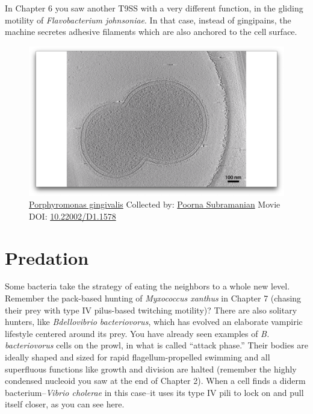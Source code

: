\documentclass[]{tufte-book}
\begin{document}
In Chapter 6 you saw another T9SS with a very different function, in the
gliding motility of \emph{Flavobacterium johnsoniae}. In that case,
instead of gingipains, the machine secretes adhesive filaments which are
also anchored to the cell surface.





\begin{figure}
\includegraphics{movie_stills/9_8} \caption[\protect\hyperlink{tree}{Porphyromonas gingivalis} Collected
by: \protect\hyperlink{poorna_subramanian}{Poorna Subramanian} Movie
DOI: \href{https://doi.org/10.22002/D1.1578}{10.22002/D1.1578}]{\protect\hyperlink{tree}{Porphyromonas gingivalis} Collected
by: \protect\hyperlink{poorna_subramanian}{Poorna Subramanian} Movie
DOI: \href{https://doi.org/10.22002/D1.1578}{10.22002/D1.1578}}\label{fig:9-8}
\end{figure}

\section{Predation}\label{predation}

Some bacteria take the strategy of eating the neighbors to a whole new
level. Remember the pack-based hunting of \emph{Myxococcus xanthus} in
Chapter 7 (chasing their prey with type IV pilus-based twitching
motility)? There are also solitary hunters, like \emph{Bdellovibrio
bacteriovorus}, which has evolved an elaborate vampiric lifestyle
centered around its prey. You have already seen examples of \emph{B.
bacteriovorus} cells on the prowl, in what is called ``attack phase.''
Their bodies are ideally shaped and sized for rapid flagellum-propelled
swimming and all superfluous functions like growth and division are
halted (remember the highly condensed nucleoid you saw at the end of
Chapter 2). When a cell finds a diderm bacterium--\emph{Vibrio cholerae}
in this case--it uses its type IV pili to lock on and pull itself
closer, as you can see here.
\end{document}
